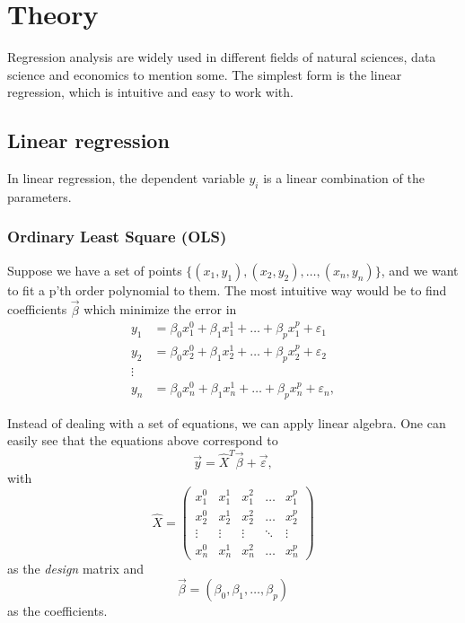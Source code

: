 \section{Theory} \label{sec:theory}
Regression analysis are widely used in different fields of natural sciences, data science and economics to mention some. The simplest form is the linear regression, which is intuitive and easy to work with. 
 
\subsection{Linear regression} \label{sec:regression}
In linear regression, the dependent variable $y_i$ is a linear combination of the parameters. \cite{hastie01statisticallearning}

\subsubsection{Ordinary Least Square (OLS)} \label{sec:OLS}
Suppose we have a set of points $\{(x_1, y_1), (x_2, y_2),\hdots, (x_n, y_n)\}$, and we want to fit a p'th order polynomial to them. The most intuitive way would be to find coefficients $\vec{\beta}$ which minimize the error in
\begin{align*}
y_1&=\beta_0x_1^0+\beta_1x_1^1+\hdots+\beta_px_1^p+\varepsilon_1\\
y_2&=\beta_0x_2^0+\beta_1x_2^1+\hdots+\beta_px_2^p+\varepsilon_2\\
\vdots\\
y_n&=\beta_0x_n^0+\beta_1x_n^1+\hdots+\beta_px_n^p+\varepsilon_n,
\end{align*}

Instead of dealing with a set of equations, we can apply linear algebra. One can easily see that the equations above correspond to
\begin{equation}
\vec{y}=\hat{X}^T\vec{\beta}+\vec{\varepsilon},
\label{eq:y_xb}
\end{equation}
with
\begin{equation}
\hat{X}=\begin{pmatrix}
x_1^0&x_1^1&x_1^2&\hdots&x_1^p\\
x_2^0&x_2^1&x_2^2&\hdots&x_2^p\\
\vdots&\vdots&\vdots&\ddots&\vdots\\
x_n^0&x_n^1&x_n^2&\hdots&x_n^p
\end{pmatrix}
\end{equation}
as the \textit{design} matrix and
\begin{equation}
\vec{\beta}=(\beta_0, \beta_1, \hdots, \beta_p)
\end{equation}
as the coefficients. 

